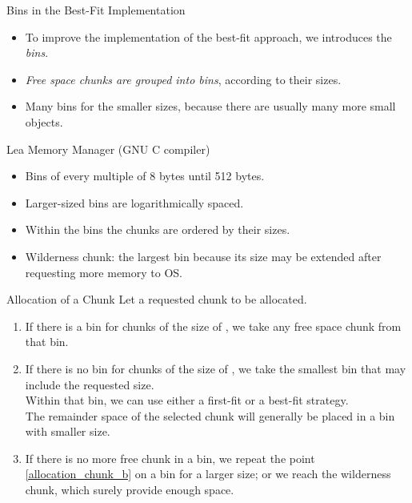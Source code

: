 \begin{bibunit}[apalike]
\begin{frame}{Bins in the Best-Fit Implementation}
	\begin{itemize}
	\item To improve the implementation of the best-fit approach, we introduces the \emph{bins}.
	\item \emph{Free space chunks are grouped into bins}, according to their sizes.
	\item Many bins for the smaller sizes, because there are usually many more small objects.
	\end{itemize}
	\begin{block}{\small Lea Memory Manager (GNU C compiler)}\small 
		\begin{itemize}
		\item Bins of every multiple of 8 bytes until 512 bytes.
		\item Larger-sized bins are logarithmically spaced.
		\item Within the bins the chunks are ordered by their sizes.
		\item Wilderness chunk: the largest bin because its size may be extended after requesting more memory to OS.
		\end{itemize}
	\end{block}
\end{frame}

\begin{frame}{Allocation of a Chunk}
	Let a requested chunk  to be allocated.
	\begin{enumerate}
	\item If there is a bin for chunks of the size of , we take any free space chunk from that bin.
	\vfill
	\item\label{allocation_chunk_b} If there is no bin for chunks of the size of , we take the smallest bin that may include the requested size. \\
		Within that bin, we can use either a first-fit or a best-fit strategy. \\
		The remainder space of the selected chunk will generally be placed in a bin with smaller size.
	\vfill
	\item If there is no more free chunk in a bin, we repeat the point \ref{allocation_chunk_b} on a bin for a larger size; or we reach the wilderness chunk, which surely provide enough space.
	\end{enumerate}
\end{frame}


\end{bibunit}
